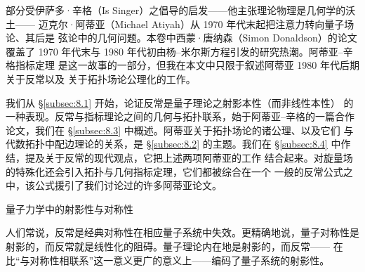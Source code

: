 \documentclass[11pt]{amsart}
\makeatletter
\def\subsection{\@startsection{subsection}{2}%
   \z@{1.25\linespacing\@plus.7\linespacing}{.5\linespacing}%
   {\normalfont\bfseries}}
\theoremstyle{definition}
\theoremstyle{remark}
\theoremstyle{plain}
\numberwithin{equation}{section}
\renewcommand{\:}{\colon}
\DeclareMathOperator{\End}{End}
\newcommand{\PP}{{\mathbb P}}
\newcommand{\PH}{\PP\sH}
\newcommand{\cP}{\sC_{\sP}}
\newcommand{\sC}{\mathscr{C}}
\newcommand{\sH}{\mathscr{H}}
\newcommand{\sP}{\mathscr{P}}
\makeatother
\begin{document}

部分受伊萨多·辛格（Is Singer）之倡导的启发——他主张理论物理是几何学的沃土——
迈克尔·阿蒂亚（Michael Atiyah）从 1970 年代末起把注意力转向量子场论、其后是
弦论中的几何问题。本卷中西蒙·唐纳森（Simon Donaldson）的论文 \cite{Do} 覆盖了
1970 年代末与 1980 年代初由杨–米尔斯方程引发的研究热潮。阿蒂亚–辛格指标定理
是这一故事的一部分，但我在本文中只限于叙述阿蒂亚 1980 年代后期关于反常以及
关于拓扑场论公理化的工作。

我们从 §\ref{subsec:8.1} 开始，论证反常是量子理论之射影本性（而非线性本性）
的一种表现。反常与指标理论之间的几何与拓扑联系，始于阿蒂亚–辛格的一篇合作
论文，我们在 §\ref{subsec:8.3} 中概述。阿蒂亚关于拓扑场论的诸公理、以及它们
与代数拓扑中配边理论的关系，是 §\ref{subsec:8.2} 的主题。我们在
§\ref{subsec:8.4} 中作结，提及关于反常的现代观点，它把上述两项阿蒂亚的工作
结合起来。对旋量场的特殊化还会引入拓扑与几何指标定理，它们都被综合在一个
一般的反常公式之中，该公式援引了我们讨论过的许多阿蒂亚论文。

   \subsection{量子力学中的射影性与对称性}\label{subsec:8.1}

人们常说，反常是经典对称性在相应量子系统中失效。更精确地说，量子对称性是
射影的，而反常就是线性化的阻碍。量子理论内在地是射影的，而反常——
在比“与对称性相联系”这一意义更广的意义上——编码了量子系统的射影性。


\end{document}

